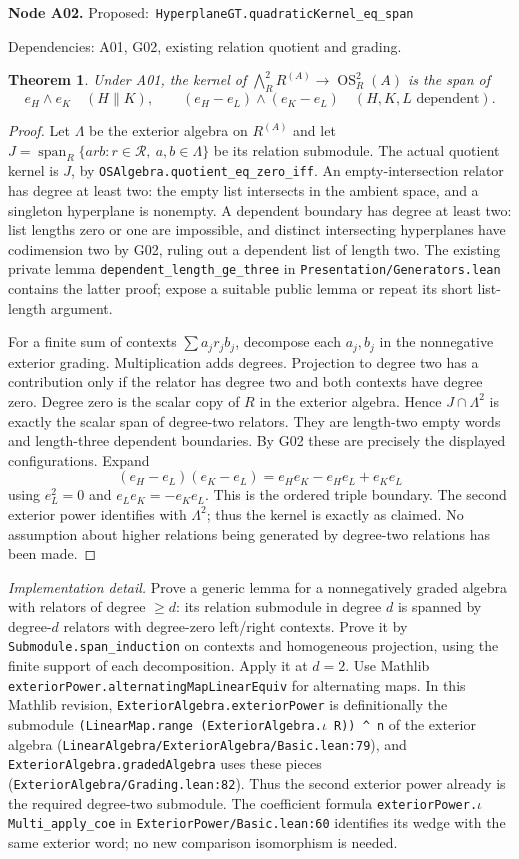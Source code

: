 \documentclass[11pt]{article}
\newtheorem{theorem}{Theorem}[section]
\theoremstyle{remark}\newtheorem{remark}[theorem]{Remark}
\newcommand{\OS}{\ensuremath{\operatorname{OS}}}
\newcommand{\Span}{\operatorname{span}}
\newcommand{\code}[1]{\nolinkurl{#1}}
\newcommand{\node}[3]{\par\Needspace{8\baselineskip}\smallskip\noindent\textbf{Node #1.}\quad
 \textsf{Proposed:}\ \code{#2}\par\noindent
 \textsf{Dependencies:} #3.\par\smallskip}
\begin{document}
\node{A02}{HyperplaneGT.quadraticKernel_eq_span}{A01, G02, existing relation quotient and grading}
\begin{theorem}\label{thm:a02}
Under A01, the kernel of
$\bigwedge_R^2 R^{(A)}\to\OS_R^2(A)$ is the span of
\[
 e_H\wedge e_K\quad(H\parallel K),\qquad
 (e_H-e_L)\wedge(e_K-e_L)\quad(H,K,L\text{ dependent}).
\]
\end{theorem}
\begin{proof}
Let $\Lambda$ be the exterior algebra on $R^{(A)}$ and let
$J=\Span_R\{arb:r\in\mathcal R,\ a,b\in\Lambda\}$ be its
relation submodule. The actual quotient kernel is $J$, by
\code{OSAlgebra.quotient_eq_zero_iff}. An empty-intersection
relator has degree at least two: the empty list intersects in the
ambient space, and a singleton hyperplane is nonempty. A dependent
boundary has degree at least two: list lengths zero or one are
impossible, and distinct intersecting hyperplanes have codimension
two by G02, ruling out a dependent list of length two. The existing
private lemma \code{dependent_length_ge_three} in
\code{Presentation/Generators.lean} contains the latter proof;
expose a suitable public lemma or repeat its short list-length argument.

For a finite sum of contexts $\sum a_jr_jb_j$, decompose each
$a_j,b_j$ in the nonnegative exterior grading. Multiplication adds
degrees. Projection to degree two has a contribution only if the
relator has degree two and both contexts have degree zero. Degree
zero is the scalar copy of $R$ in the exterior algebra. Hence
$J\cap\Lambda^2$ is exactly the scalar span of degree-two relators.
They are length-two empty words and length-three dependent
boundaries. By G02 these are precisely the displayed configurations.
Expand
\[
 (e_H-e_L)(e_K-e_L)=e_He_K-e_He_L+e_Ke_L
\]
using $e_L^2=0$ and $e_Le_K=-e_Ke_L$. This is the ordered triple
boundary. The second exterior power identifies with $\Lambda^2$;
thus the kernel is exactly as claimed. No assumption about higher
relations being generated by degree-two relations has been made.
\end{proof}
\emph{Implementation detail.} Prove a generic lemma for a
nonnegatively graded algebra with relators of degree $\geq d$:
its relation submodule in degree $d$ is spanned by degree-$d$
relators with degree-zero left/right contexts. Prove it by
\code{Submodule.span_induction} on contexts and homogeneous
projection, using the finite support of each decomposition. Apply
it at $d=2$. Use Mathlib
\code{exteriorPower.alternatingMapLinearEquiv} for alternating maps.
In this Mathlib revision, \code{ExteriorAlgebra.exteriorPower} is
definitionally the submodule
\texttt{(LinearMap.range (ExteriorAlgebra.}$\iota$\texttt{ R)) \^{} n}
of the exterior
algebra (\code{LinearAlgebra/ExteriorAlgebra/Basic.lean:79}), and
\code{ExteriorAlgebra.gradedAlgebra} uses these pieces
(\code{ExteriorAlgebra/Grading.lean:82}). Thus the second exterior
power already is the required degree-two submodule. The coefficient
formula \code{exteriorPower.}$\iota$\code{Multi_apply_coe} in
\code{ExteriorPower/Basic.lean:60} identifies its wedge with the
same exterior word; no new comparison isomorphism is needed.
\end{document}
